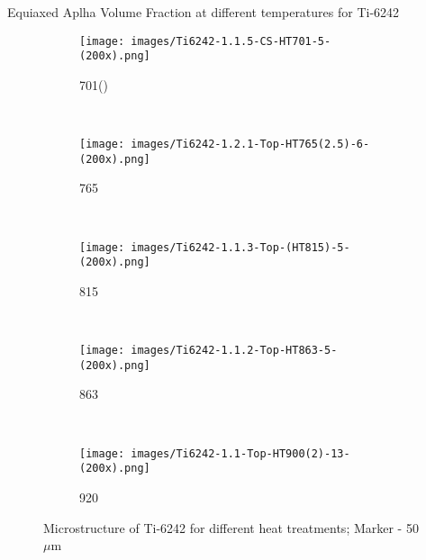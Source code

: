 \documentclass[10pt]{beamer}
\begin{document}

\begin{frame}{Equiaxed Aplha Volume Fraction at different temperatures for Ti-6242}
\begin{figure}[H]
    \centering
    \begin{subfigure}{0.25\textwidth}
        \texttt{[image: images/Ti6242-1.1.5-CS-HT701-5-(200x).png]}
        \caption{701\degC ()}
        \label{fig:Ti-6242 HT700}
    \end{subfigure}    
    ~
    \begin{subfigure}{0.25\textwidth}
        \texttt{[image: images/Ti6242-1.2.1-Top-HT765(2.5)-6-(200x).png]}
        \caption{765\degC}
        \label{fig:Ti-6242 HT752}
    \end{subfigure}   
   \\
    \begin{subfigure}{0.25\textwidth}
        \texttt{[image: images/Ti6242-1.1.3-Top-(HT815)-5-(200x).png]}
        \caption{815\degC}
        \label{fig:Ti-6242 HT815}
    \end{subfigure}
    ~
    \begin{subfigure}{0.25\textwidth}
        \texttt{[image: images/Ti6242-1.1.2-Top-HT863-5-(200x).png]}
        \caption{863\degC}
        \label{fig:Ti-6242 HT863}
    \end{subfigure}
    ~
    \begin{subfigure}{0.25\textwidth}
        \texttt{[image: images/Ti6242-1.1-Top-HT900(2)-13-(200x).png]}
        \caption{920\degC}
        \label{fig:Ti-6242 HT920}
    \end{subfigure}        
   
    \caption{Microstructure of Ti-6242 for different heat treatments; Marker - 50$\mu$m}
    
\end{figure}
\end{frame}




\begin{frame}{Equiaxed Aplha Volume Fraction at different temperatures for Ti-6242}
\begin{figure}[H]
    \centering
        \texttt{[image: \\HeatTreatment\{Voulme\_Fraction.eps]}}
        \caption{Volume Fraction at different temperatures for Ti-6242}
\end{figure}
\end{frame}
\end{document}
